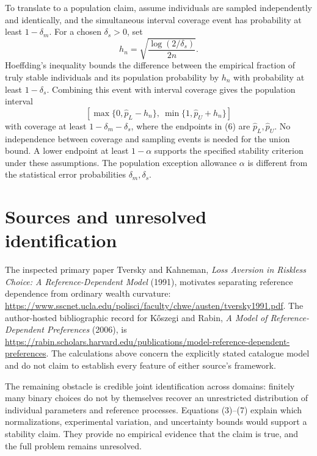 \documentclass[11pt]{article}
\begin{document}
To translate to a population claim, assume individuals are sampled independently and identically, and the simultaneous interval coverage event has probability at least $1-\delta_m$. For a chosen $\delta_s>0$, set
\[
 h_n=\sqrt{\frac{\log(2/\delta_s)}{2n}}.
\]
Hoeffding's inequality bounds the difference between the empirical fraction of truly stable individuals and its population probability by $h_n$ with probability at least $1-\delta_s$. Combining this event with interval coverage gives the population interval
\[
 \left[\max\{0,\widehat p_L-h_n\},\ \min\{1,\widehat p_U+h_n\}\right] \tag{7}
\]
with coverage at least $1-\delta_m-\delta_s$, where the endpoints in (6) are $\widehat p_L,\widehat p_U$. No independence between coverage and sampling events is needed for the union bound. A lower endpoint at least $1-\alpha$ supports the specified stability criterion under these assumptions. The population exception allowance $\alpha$ is different from the statistical error probabilities $\delta_m,\delta_s$.

\section*{Sources and unresolved identification}
The inspected primary paper Tversky and Kahneman, \emph{Loss Aversion in Riskless Choice: A Reference-Dependent Model} (1991), motivates separating reference dependence from ordinary wealth curvature:
\url{https://www.sscnet.ucla.edu/polisci/faculty/chwe/austen/tversky1991.pdf}.
The author-hosted bibliographic record for K\H{o}szegi and Rabin, \emph{A Model of Reference-Dependent Preferences} (2006), is
\url{https://rabin.scholars.harvard.edu/publications/model-reference-dependent-preferences}.
The calculations above concern the explicitly stated catalogue model and do not claim to establish every feature of either source's framework.

The remaining obstacle is credible joint identification across domains: finitely many binary choices do not by themselves recover an unrestricted distribution of individual parameters and reference processes. Equations (3)--(7) explain which normalizations, experimental variation, and uncertainty bounds would support a stability claim. They provide no empirical evidence that the claim is true, and the full problem remains unresolved.
\end{document}

